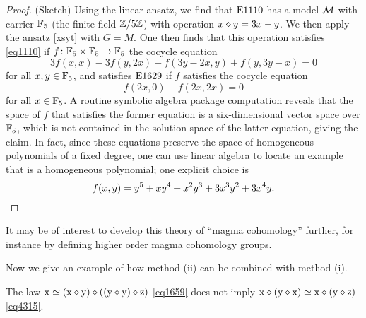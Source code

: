 \begin{proof}  (Sketch) Using the linear ansatz, we find that $\mathrm{E}1110$ has a model ${\mathcal{M}}$ with carrier $\mathbb{F}_5$ (the finite field $\mathbb{Z}/5\mathbb{Z}$) with operation $x \diamond y = 3x-y$.  We then apply the ansatz \eqref{xsyt} with $G=M$.  One then finds that this operation satisfies \eqref{eq1110} if $f \colon \mathbb{F}_5 \times \mathbb{F}_5 \to \mathbb{F}_5$  the cocycle equation
  $$3f(x,x) - 3f(y,2x) - f(3y-2x,y) + f(y,3y-x) = 0$$
for all $x,y \in \mathbb{F}_5$, and satisfies $\mathrm{E}1629$ if $f$ satisfies the cocycle equation
$$ f(2x,0) - f(2x,2x) = 0$$
for all $x \in \mathbb{F}_5$.  A routine symbolic algebra package computation reveals that the space of $f$ that satisfies the former equation is a six-dimensional vector space over $\mathbb{F}_5$, which is not contained in the solution space of the latter equation, giving the claim.
In fact, since these equations preserve the space of homogeneous polynomials of a fixed degree, one can use linear algebra to locate an example that is a homogeneous polynomial; one explicit choice is
\[
f(x,y) = y^5 +xy^4 + x^2y^3 +3x^3 y^2 + 3x^4 y. \qedhere
\]
\end{proof}

It may be of interest to develop this theory of ``magma cohomology'' further, for instance by defining higher order magma cohomology groups.

Now we give an example of how method (ii) can be combined with method (i).

\begin{proposition}\label{1659-4315} The law $\mathrm{x} \simeq (\mathrm{x} \diamond \mathrm{y}) \diamond ((\mathrm{y} \diamond \mathrm{y}) \diamond \mathrm{z})$ \eqref{eq1659} does not imply $\mathrm{x} \diamond (\mathrm{y} \diamond \mathrm{x}) \simeq \mathrm{x} \diamond (\mathrm{y} \diamond \mathrm{z})$ \eqref{eq4315}.
\end{proposition}

